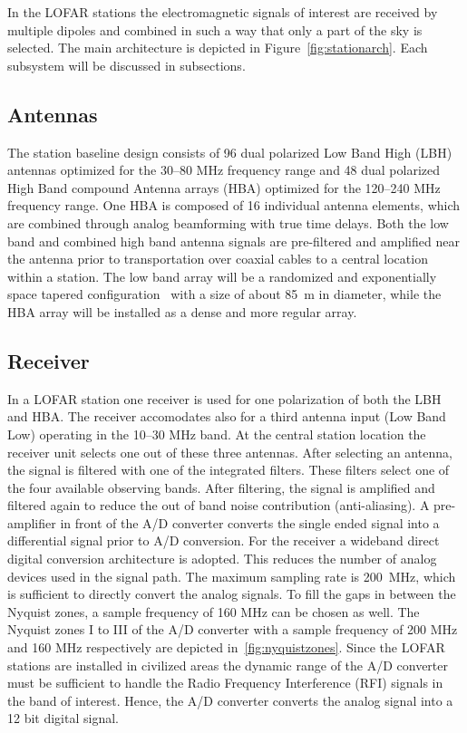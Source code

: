 \documentclass[journal]{IEEEtran}
\begin{document}
In the LOFAR stations the electromagnetic signals of interest are received by multiple dipoles and combined in such a way that only a part of the sky is selected. The main architecture is depicted in Figure~\ref{fig:stationarch}. Each subsystem will be discussed in subsections.


\subsection{Antennas}

The station baseline design consists of 96 dual polarized Low Band High (LBH) antennas optimized for the 30--80 MHz frequency range and 48 dual polarized High Band compound Antenna arrays (HBA) optimized for the 120--240 MHz frequency range. One HBA is composed of 16 individual antenna elements, which are combined through analog beamforming with true time delays. Both the low band and combined high band antenna signals are pre-filtered and amplified near the antenna prior to transportation over coaxial cables to a central location within a station. The low band array will be a randomized and exponentially space tapered configuration~\cite{capp:06} with a size of about 85~m in diameter, while the HBA array will be installed as a dense and more regular array. 

\subsection{Receiver}
In a LOFAR station one receiver is used for one polarization of both the LBH and HBA. The receiver accomodates also for a third antenna input (Low Band Low) operating in the 10--30 MHz band. At the central station location the receiver unit selects one out of these three antennas. After selecting an antenna, the signal is filtered with one of the integrated filters. These filters select one of the four available observing bands. After filtering, the signal is amplified and filtered again to reduce the out of band noise contribution (anti-aliasing). A pre-amplifier in front of the A/D converter converts the single ended signal into a differential signal prior to A/D conversion. For the receiver a wideband direct digital conversion architecture is adopted. This reduces the number of analog devices used in the signal path. The maximum sampling rate is 200~MHz, which is sufficient to directly convert the analog signals. To fill the gaps in between the Nyquist zones, a sample frequency of 160 MHz can be chosen as well. The Nyquist zones I to III of the A/D converter with a sample frequency of 200 MHz and 160 MHz respectively are depicted in~\ref{fig:nyquistzones}. 
Since the LOFAR stations are installed in civilized areas the dynamic range of the A/D converter must be sufficient to handle the Radio Frequency Interference (RFI) signals in the band of interest. Hence, the A/D converter converts the analog signal into a 12 bit digital signal. 
\end{document}
